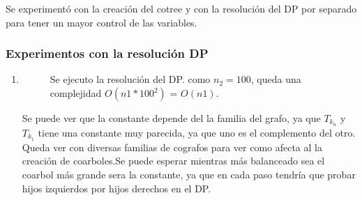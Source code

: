     Se experimentó con la creación del cotree y con la resolución del DP por separado para tener un mayor control de las variables.

 
   \subsubsection{ Experimentos con la resolución DP}

   \begin{enumerate}
    
    \item \hfill

    \begin{figure}[H]
        \centering
        \caption{Se ejecuto la resolución del DP. como $n_2 = 100$, queda una complejidad $O(n1* 100^2)$ = $O(n1)$.}
        \label{fig:exp3:var-nym-base}
    \end{figure}

    Se puede ver que la constante depende del la familia del grafo, ya que $T_{k_n}$ y $T_{k_1}$ tiene una constante muy parecida, ya que uno es el complemento del otro. Queda ver con diversas familias de cografos para ver como afecta al la creación de coarboles.Se puede esperar mientras más balanceado sea el coarbol más grande sera la constante, ya que en cada paso tendría que probar hijos izquierdos por hijos derechos en el DP.
    


\end{enumerate}

